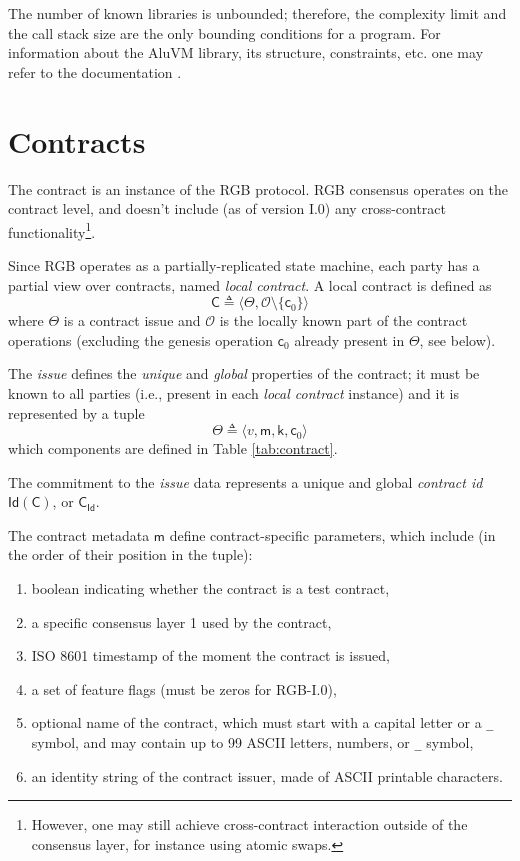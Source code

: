 \documentclass[9pt,oneside]{amsart}
\begin{document}
\begin{multicols}{2}
The number of known libraries is unbounded; therefore, the complexity limit and the call stack size
are the only bounding conditions for a program.
For information about the AluVM library, its structure, constraints, etc. one may refer to the
documentation \cite{AluVM}.

\section{Contracts}

The contract is an instance of the RGB protocol. RGB consensus operates on the contract level,
and doesn't include (as of version I.0) any cross-contract functionality\footnote{%
However, one may still achieve cross-contract interaction outside of the consensus layer,
for instance using atomic swaps.}.

Since RGB operates as a partially-replicated state machine,
each party has a partial view over contracts, named \emph{local contract}. 
A local contract is defined as
\noindent
\begin{equation}
\mathsf{C} \triangleq \langle \mathsf{\Theta}, \mathcal{O} \setminus \{ \mathsf{c}_0 \} \rangle
\end{equation}
\noindent
where $\Theta$ is a contract issue and
$\mathcal{O}$ is the locally known part of the contract operations
(excluding the genesis operation $\mathsf{c}_0$ already present in $\Theta$, see below).

The \emph{issue} defines the \emph{unique} and \emph{global} properties of the contract;
it must be known to all parties (i.e., present in each \emph{local contract} instance) and
it is represented by a tuple
\noindent
\begin{equation}
\mathsf{\Theta} \triangleq \langle v, \mathsf{m}, \mathsf{k}, \mathsf{c}_0 \rangle
\end{equation}
\noindent
which components are defined in Table \ref{tab:contract}.

The commitment to the \emph{issue} data represents a unique and global \emph{contract id}
$\mathsf{Id}(\mathsf{C})$, or $\mathsf{C_{Id}}$.

The contract metadata $\mathsf{m}$ define contract-specific parameters, which include
(in the order of their position in the tuple):

\begin{enumerate}
\item boolean indicating whether the contract is a test contract,
\item a specific consensus layer 1 used by the contract,
\item ISO 8601 timestamp of the moment the contract is issued,
\item a set of feature flags (must be zeros for RGB-I.0),
\item optional name of the contract, which must start with a capital letter or a \texttt{\_} symbol,
  and may contain up to 99 ASCII letters, numbers, or \texttt{\_} symbol,
\item an identity string of the contract issuer, made of ASCII printable characters.
\end{enumerate}

\end{multicols}
\end{document}

